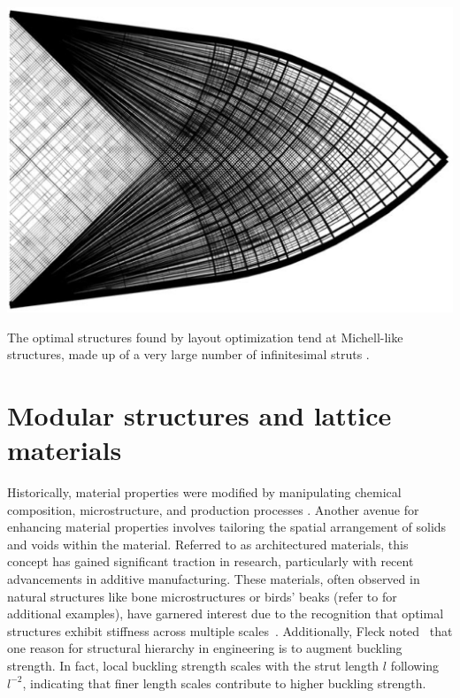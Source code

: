 \begin{marginfigure}
    \centering
    \includegraphics[width=\linewidth]{figures/02_literature/truss-ex.png}
    \caption{The optimal structures found by layout optimization tend at Michell-like structures, made up of a very large number of infinitesimal struts \cite{gilbert_layout_2003}.}
    \label{fig:02_truss-ex}
\end{marginfigure}

\section{Modular structures and lattice materials}
Historically, material properties were modified by manipulating chemical composition, microstructure, and production processes . Another avenue for enhancing material properties involves tailoring the spatial arrangement of solids and voids within the material. Referred to as architectured materials, this concept has gained significant traction in research, particularly with recent advancements in additive manufacturing. These materials, often observed in natural structures like bone microstructures or birds' beaks (refer to  for additional examples), have garnered interest due to the recognition that optimal structures exhibit stiffness across multiple scales~. Additionally, Fleck noted~ that one reason for structural hierarchy in engineering is to augment buckling strength. In fact, local buckling strength scales with the strut length $l$ following $l^{-2}$, indicating that finer length scales contribute to higher buckling strength.

